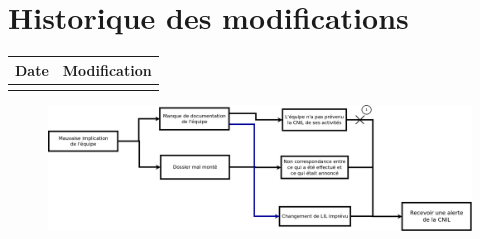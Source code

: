 \section*{Historique des modifications}
\begin{table}[H]
\centering
	\begin{tabularx}{12.8cm}{|X|X|}
	\hline
	Date & Modification \\
	\hline
	  & \\
	\hline
	\end{tabularx}
\end{table}
\newpage


\begin{figure}
	\centering
	\includegraphics[scale=0.35]{images/AnalyseRisque_nPourquoi_FDR010.png}
\end{figure}